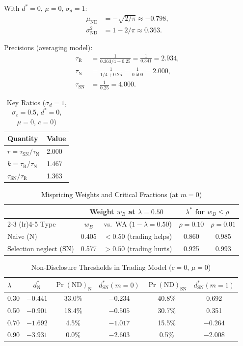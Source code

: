 \documentclass[12pt]{article}
\theoremstyle{plain}
\theoremstyle{definition}
\newcommand{\ND}{\mathrm{ND}}
\newcommand{\R}{\mathrm{R}}
\newcommand{\SN}{\mathrm{SN}}
\newcommand{\N}{\mathrm{N}}
\begin{document}
With $d^* = 0$, $\mu = 0$, $\sigma_d = 1$:
\begin{align*}
\mu_{\ND} &= -\sqrt{2/\pi} \approx -0.798, \\
\sigma_{\ND}^2 &= 1 - 2/\pi \approx 0.363.
\end{align*}

Precisions (averaging model):
\begin{align*}
\tau_\R &= \frac{1}{0.363/4 + 0.25} = \frac{1}{0.341} = 2.934, \\
\tau_\N &= \frac{1}{1/4 + 0.25} = \frac{1}{0.500} = 2.000, \\
\tau_\SN &= \frac{1}{0.25} = 4.000.
\end{align*}

\begin{table}[h!]
\centering
\caption{Key Ratios ($\sigma_d=1$, $\sigma_\varepsilon=0.5$, $d^*=0$, $\mu = 0$, $c = 0$)}
\label{tab:ratios}
\begin{tabular}{ll}
\toprule
Quantity & Value \\
\midrule
$r = \tau_\SN/\tau_\N$ & 2.000 \\
$k = \tau_\R/\tau_\N$ & 1.467 \\
$\tau_\SN/\tau_\R$ & 1.363 \\
\bottomrule
\end{tabular}
\end{table}

\begin{table}[h!]
\centering
\caption{Mispricing Weights and Critical Fractions (at $m = 0$)}
\label{tab:results}
\begin{tabular}{lcccc}
\toprule
& \multicolumn{2}{c}{Weight $w_B$ at $\lambda = 0.50$} & \multicolumn{2}{c}{$\lambda^*$ for $w_B \leq \rho$} \\
\cmidrule(lr){2-3} \cmidrule(lr){4-5}
Type & $w_B$ & vs.\ WA ($1-\lambda = 0.50$) & $\rho = 0.10$ & $\rho = 0.01$ \\
\midrule
Naive ($\N$) & 0.405 & $< 0.50$ (trading helps) & 0.860 & 0.985 \\
Selection neglect ($\SN$) & 0.577 & $> 0.50$ (trading hurts) & 0.925 & 0.993 \\
\bottomrule
\end{tabular}
\end{table}

\begin{table}[h!]
\centering
\caption{Non-Disclosure Thresholds in Trading Model ($c = 0$, $\mu = 0$)}
\label{tab:thresholds}
\begin{tabular}{lccccc}
\toprule
$\lambda$ & $d^*_\N$ & $\Pr(\ND)_\N$ & $d^*_\SN(m{=}0)$ & $\Pr(\ND)_\SN$ & $d^*_\SN(m{=}1)$ \\
\midrule
0.30 & $-0.441$ & 33.0\% & $-0.234$ & 40.8\% & 0.692 \\
0.50 & $-0.901$ & 18.4\% & $-0.505$ & 30.7\% & 0.351 \\
0.70 & $-1.692$ & 4.5\% & $-1.017$ & 15.5\% & $-0.264$ \\
0.90 & $-3.931$ & 0.0\% & $-2.603$ & 0.5\% & $-2.008$ \\
\bottomrule
\end{tabular}
\end{table}
\end{document}
